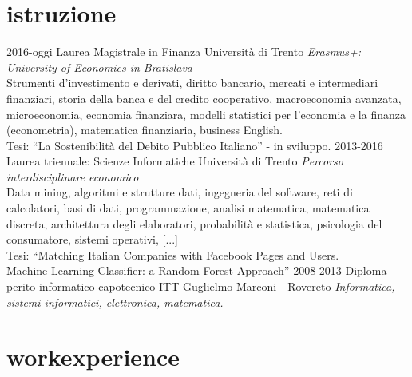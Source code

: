 \documentclass[]{friggeri-cv}
\begin{document}
\section{istruzione}

\begin{entrylist}

\entry
    {2016-oggi}
    {Laurea Magistrale in Finanza}
    {Università di Trento}
    {\emph{Erasmus+: University of Economics in Bratislava}\\
    Strumenti d'investimento e derivati, diritto bancario, mercati e intermediari finanziari, storia della banca e del credito cooperativo, macroeconomia avanzata, microeconomia, economia finanziara, modelli statistici per l'economia e la finanza (econometria), matematica finanziaria, business English.\\ 
    Tesi: “La Sostenibilità del Debito Pubblico Italiano” - in sviluppo.
    }
\entry
    {2013-2016}
    {Laurea triennale: Scienze Informatiche}
    {Università di Trento}
    {\emph{Percorso interdisciplinare economico}\\
    Data mining, algoritmi e strutture dati, ingegneria del software, reti di calcolatori, basi di dati, programmazione, analisi matematica, matematica discreta, architettura degli elaboratori, probabilità e statistica, psicologia del consumatore, sistemi operativi, [...]\\
    Tesi: “Matching Italian Companies with Facebook Pages and Users.\\Machine Learning Classifier: a Random Forest Approach”
    }
\entry
    {2008-2013}
    {Diploma perito informatico capotecnico}
    {ITT Guglielmo Marconi - Rovereto}
    {\emph{Informatica, sistemi informatici, elettronica, matematica.}}

\end{entrylist}

\section{workexperience}
\end{document}
